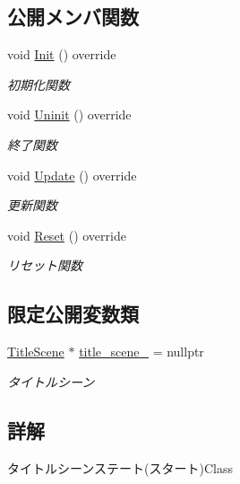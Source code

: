 \subsection*{公開メンバ関数}
\begin{DoxyCompactItemize}
\item 
void \mbox{\hyperlink{class_title_scene_state___start_a3e785ba088ac3fd0989fd657e5d0cd34}{Init}} () override
\begin{DoxyCompactList}\small\item\em 初期化関数 \end{DoxyCompactList}\item 
void \mbox{\hyperlink{class_title_scene_state___start_a5bcb4d7a9250ea1c0041c38616ffabfe}{Uninit}} () override
\begin{DoxyCompactList}\small\item\em 終了関数 \end{DoxyCompactList}\item 
void \mbox{\hyperlink{class_title_scene_state___start_a2e98cf6810711b58766d7147168d02eb}{Update}} () override
\begin{DoxyCompactList}\small\item\em 更新関数 \end{DoxyCompactList}\item 
void \mbox{\hyperlink{class_title_scene_state___start_af4dfe902a4391ca8f0cff5d1aa9507f8}{Reset}} () override
\begin{DoxyCompactList}\small\item\em リセット関数 \end{DoxyCompactList}\end{DoxyCompactItemize}
\subsection*{限定公開変数類}
\begin{DoxyCompactItemize}
\item 
\mbox{\hyperlink{class_title_scene}{Title\+Scene}} $\ast$ \mbox{\hyperlink{class_title_scene_state___start_a1a0dde9e9834cb18e0cf1e1ab12a2129}{title\+\_\+scene\+\_\+}} = nullptr
\begin{DoxyCompactList}\small\item\em タイトルシーン \end{DoxyCompactList}\end{DoxyCompactItemize}


\subsection{詳解}
タイトルシーンステート(スタート)Class 

